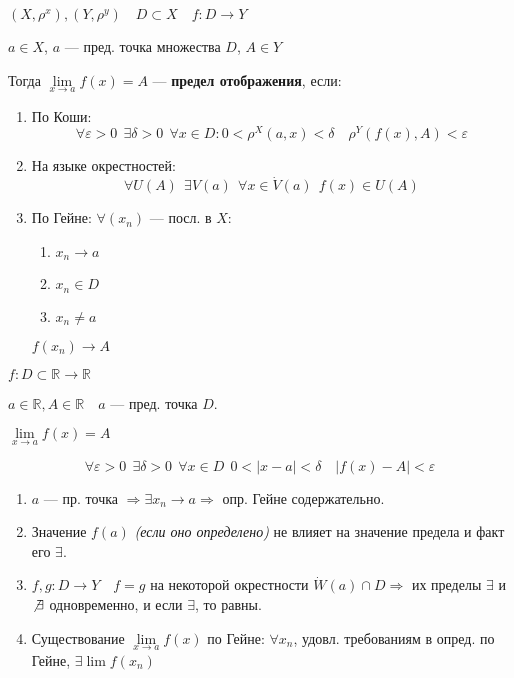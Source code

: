 \begin{definition}
    $(X, \rho^x), (Y, \rho^y) \quad D\subset X \quad f:D\to Y$

    $a\in X$, $a$ --- пред. точка множества $D$, $A\in Y$

    Тогда $\lim\limits_{x\to a}f(x)=A$ --- \textbf{предел отображения}, если:
    \begin{enumerate}
    \item По Коши:
    $$\forall \varepsilon>0 \ \ \exists \delta>0 \ \ \forall x\in D : 0<\rho^X(a,x)<\delta \quad \rho^Y(f(x), A) < \varepsilon$$
    \item На языке окрестностей:
    $$\forall U(A) \ \ \exists V(a) \ \ \forall x\in \dot V(a) \ \ f(x)\in U(A)$$
    \item По Гейне: $\forall (x_n)$ --- посл. в $X$:
    \begin{enumerate}
        \item $x_n\to a$
        \item $x_n\in D$
        \item $x_n\not = a$
    \end{enumerate}
    $f(x_n)\to A$
    \end{enumerate}
\end{definition}

\begin{consequence}
    $f:D\subset\mathbb{R} \to \mathbb{R}$
    
    $a\in\mathbb{R}, A\in\mathbb{R} \quad a$ --- пред. точка $D$.

    $\lim\limits_{x\to a} f(x)=A$

    $$\forall \varepsilon > 0 \ \ \exists \delta>0 \ \ \forall x\in D \ \ 0<|x-a|<\delta \quad |f(x)-A|<\varepsilon$$
\end{consequence}

\begin{remark}
    \begin{enumerate}
        \item $a$ --- пр. точка $\Rightarrow \exists x_n\to a \Rightarrow$ опр. Гейне содержательно.
        \item Значение $f(a)$ \textit{(если оно определено)} не влияет на значение предела и факт его $\exists$.
        \item $f,g:D\to Y \quad f=g$ на некоторой окрестности $\dot W(a)\cap D \Rightarrow$ их пределы $\exists$ и $\not \exists$ одновременно, и если $\exists$, то равны.
        \item Существование $\lim\limits_{x\to a} f(x)$ по Гейне: $\forall x_n$, удовл. требованиям в опред. по Гейне, $\exists\lim f(x_n)$
    \end{enumerate}
\end{remark}


